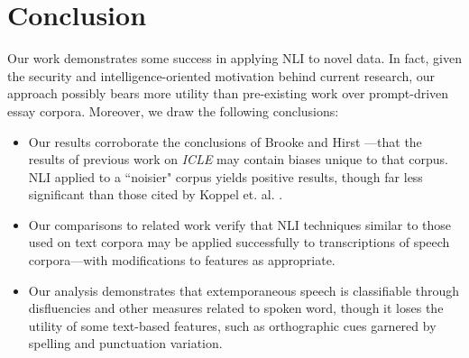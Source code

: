\documentclass[11pt]{article}
\begin{document}
\section{Conclusion}
Our work demonstrates some success in applying NLI to novel data. In fact, given the security and intelligence-oriented motivation behind current research, our approach possibly bears more utility than pre-existing work over prompt-driven essay corpora. Moreover, we draw the following conclusions:

\begin{itemize}
\item Our results corroborate the conclusions of Brooke and Hirst ---that the results of previous work on \emph{ICLE} may contain biases unique to that corpus. NLI applied to a ``noisier" corpus yields positive results, though far less significant than those cited by Koppel et. al. .
\item Our comparisons to related work verify that NLI techniques similar to those used on text corpora may be applied successfully to transcriptions of speech corpora---with modifications to features as appropriate.
\item Our analysis demonstrates that extemporaneous speech is classifiable through disfluencies and other measures related to spoken word, though it loses the utility of some text-based features, such as orthographic cues garnered by spelling and punctuation variation.
\end{itemize}




\end{document}
